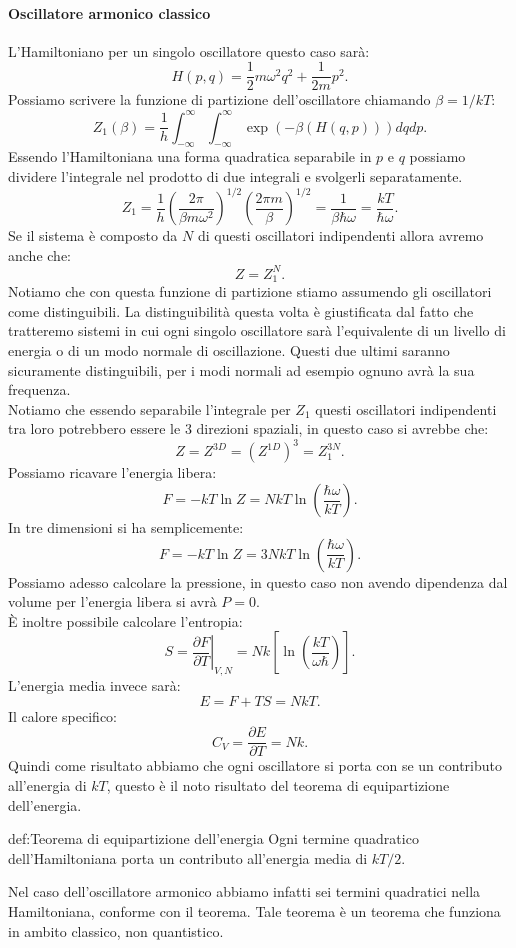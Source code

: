 \paragraph{Oscillatore armonico classico}
L'Hamiltoniano per un singolo oscillatore questo caso sarà:
\[
	H( p,q) = \frac{1}{2}m\omega ^2q^2 + \frac{1}{2m}p^2
.\] 
Possiamo scrivere la funzione di partizione dell'oscillatore chiamando $\beta  = 1 /kT$:
\[
	Z_1( \beta )  = \frac{1}{h}\int_{-\infty}^{\infty} \int_{-\infty}^{\infty} \exp\left( -\beta \left( H( q,p)  \right)  \right) dqdp  
.\] 
Essendo l'Hamiltoniana una forma quadratica separabile in $p$ e $q$ possiamo dividere l'integrale nel prodotto di due integrali e svolgerli separatamente.
\[
	Z_1 = \frac{1}{h}\left( \frac{2\pi}{\beta m\omega ^2} \right) ^{1 /2}\left( \frac{2\pi m }{\beta } \right) ^{1/ 2} = \frac{1}{\beta \hbar \omega }= \frac{kT}{\hbar\omega }
.\] 
Se il sistema è composto da $N$ di questi oscillatori indipendenti allora avremo anche che:
\[
	Z = Z_{1}^{N}
.\] 
Notiamo che con questa funzione di partizione stiamo assumendo gli oscillatori come distinguibili. La distinguibilità questa volta è giustificata dal fatto che tratteremo sistemi in cui ogni singolo oscillatore sarà l'equivalente di un livello di energia o di un modo normale di oscillazione. Questi due ultimi saranno sicuramente distinguibili, per i modi normali ad esempio ognuno avrà la sua frequenza.\\
Notiamo che essendo separabile l'integrale per $Z_1$ questi oscillatori indipendenti tra loro potrebbero essere le 3 direzioni spaziali, in questo caso si avrebbe che:
\[
	Z = Z^{3D}= \left( Z^{1D} \right)^3 = Z_1^{3N}
.\] 
Possiamo ricavare l'energia libera:
\[
	F = -kT \ln Z = NkT \ln \left( \frac{\hbar\omega }{kT} \right) 
.\] 
In tre dimensioni si ha semplicemente:
\[
	F = -kT \ln Z = 3NkT \ln \left( \frac{\hbar\omega }{kT} \right) 
.\] 
Possiamo adesso calcolare la pressione, in questo caso non avendo dipendenza dal volume per l'energia libera si avrà $P = 0$. \\
È inoltre possibile calcolare l'entropia:
 \[
	 S = \left.\frac{\partial F}{\partial T} \right|_{V, N} = Nk \left[ \ln \left( \frac{kT}{\omega \hbar} \right)  \right] 
.\] 
L'energia media invece sarà:
\[
	E = F + TS = NkT
.\] 
Il calore specifico:
\[
	C_{V} = \frac{\partial E}{\partial T} = Nk
.\] 
Quindi come risultato abbiamo che ogni oscillatore si porta con se un contributo all'energia di $kT$, questo è il noto risultato del teorema di equipartizione dell'energia.
\begin{defn}{def:Teorema di equipartizione dell'energia}
	Ogni termine quadratico dell'Hamiltoniana porta un contributo all'energia media di $kT /2$.
\end{defn}
Nel caso dell'oscillatore armonico abbiamo infatti sei termini quadratici nella Hamiltoniana, conforme con il teorema. Tale teorema è un teorema che funziona in ambito classico, non quantistico.

